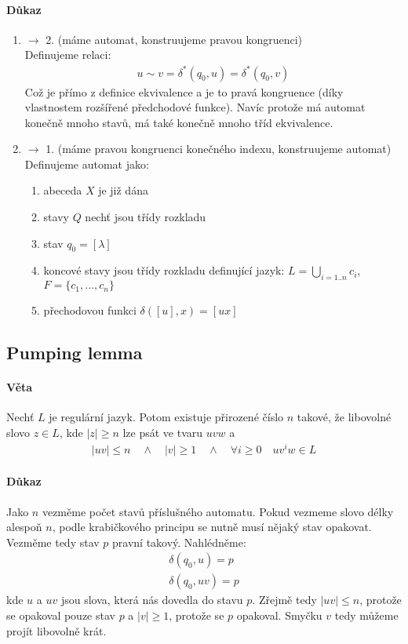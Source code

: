 \documentclass[a4paper,12pt,titlepage]{article}
\begin{document}
\paragraph{Důkaz}
\begin{enumerate}
	\item $\to$ 2. (máme automat, konstruujeme pravou kongruenci)\\
		Definujeme relaci:
		\begin{align}
			u\sim v = \delta^*(q_0, u) = \delta^*(q_0, v)
		\end{align}
		Což je přímo z definice ekvivalence a je to pravá kongruence (díky
		vlastnostem rozšířené předchodové funkce). Navíc protože má automat
		konečně mnoho stavů, má také konečně mnoho tříd ekvivalence.
	\item $\to$ 1. (máme pravou kongruenci konečného indexu, konstruujeme
	automat)
		Definujeme automat jako:
			\begin{enumerate}
				\item abeceda $X$ je již dána
				\item stavy $Q$ nechť jsou třídy rozkladu
				\item stav $q_0 = [\lambda]$
				\item koncové stavy jsou třídy rozkladu definující jazyk:
					$L= \bigcup_{i=1..n} c_i$, 
					$F = \{c_1, ..., c_n\}$ 
				\item přechodovou funkci $\delta([u],x) = [ux]$
			\end{enumerate}
\end{enumerate}
\subsection{Pumping lemma}
\setcounter{equation}{0}
\paragraph{Věta}
Nechť $L$ je regulární jazyk. Potom existuje přirozené číslo $n$ takové, že
libovolné slovo $z \in L$, kde $|z|\ge n$ lze psát ve tvaru $uvw$ a 
\begin{align*}
	|uv| \le n \quad \land \quad |v| \ge 1 \quad \land \quad \forall i \ge 0
	\quad uv^iw \in L
\end{align*}
\paragraph{Důkaz}
Jako $n$ vezměme počet stavů příslušného automatu. Pokud vezmeme slovo délky
alespoň $n$, podle krabičkového principu se nutně musí nějaký stav opakovat.
Vezměme tedy stav $p$ pravní takový. Nahlédněme:
\begin{align}
	\delta(q_0, u) = p \\
	\delta(q_0, uv) = p
\end{align}
kde $u$ a $uv$ jsou slova, která nás dovedla do stavu $p$. Zřejmě tedy $|uv| \le
n$, protože se opakoval pouze stav $p$ a $|v| \ge 1$, protože se $p$ opakoval.
Smyčku $v$ tedy můžeme projít libovolně krát.
\end{document}
